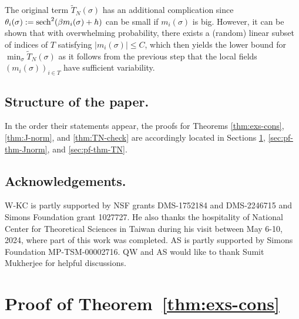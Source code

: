 \documentclass[letterpaper,11pt,reqno]{amsart}
\renewcommand{\le}{\leqslant}
\newcommand{\mvgs}{{\sigma}}
\DeclareMathOperator{\sech}{sech}
\begin{document}
The original term $ \widetilde T_N(\mvgs)$ has an additional complication since $\theta_i(\mvgs) := \sech^2(\gb m_i(\mvgs)+h)$ can be  small if $m_i(\mvgs)$ is big. However, it can be shown that with overwhelming probability, there exists a (random) linear subset of indices of $T$ satisfying  $|m_i(\mvgs)| \le C$, which then yields the lower bound for $ \min_{\mvgs} \widetilde T_N(\mvgs)$ as it follows from the previous step that the local fields $(m_i(\mvgs))_{i \in T}$ have sufficient variability.




\subsection{Structure of the paper.} In the order their statements appear, the proofs for Theorems \ref{thm:exs-cons}, \ref{thm:J-norm}, and \ref{thm:TN-check} are accordingly located in Sections \ref{sec:pf-exist-cons}, \ref{sec:pf-thm-Jnorm}, and \ref{sec:pf-thm-TN}. 

\subsection{Acknowledgements.}
W-KC is partly supported by NSF grants DMS-1752184 and DMS-2246715 and Simons Foundation grant 1027727. He also thanks the hospitality of National Center for Theoretical Sciences in Taiwan during his visit between May 6-10, 2024, where part of this work was completed. AS is partly supported by Simons Foundation MP-TSM-00002716. QW and AS would like to thank Sumit Mukherjee for helpful discussions. 

\section{Proof of Theorem~\ref{thm:exs-cons}}\label{sec:pf-exist-cons}
\end{document}
